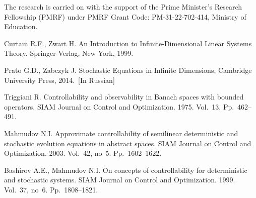 \documentclass[12pt]{llncs}
\begin{document}

%

The research is carried on with the support of the Prime Minister's Research Fellowship (PMRF) under PMRF Grant Code: PM-31-22-702-414, Ministry of Education.

\begin{thebibliography}{9} %

 Curtain R.F., Zwart H. An Introduction to Infinite-Dimensional Linear Systems Theory. Springer-Verlag, New York, 1999.

 Prato G.D., Zabczyk J. Stochastic Equations in Infinite Dimensions, Cambridge University Press, 2014.~[In Russian]

 Triggiani R. Controllability and observability in Banach spaces with bounded operators. SIAM Journal on Control and Optimization. 1975. Vol.~13. Pp.~462--491.

  Mahmudov N.I. Approximate controllability of semilinear deterministic and stochastic evolution equations in abstract spaces. SIAM Journal on Control and Optimization. 2003. Vol.~42, no~5. Pp.~1602--1622.

 Bashirov A.E., Mahmudov N.I. On concepts of controllability for deterministic and stochastic systems. SIAM Journal on Control and Optimization. 1999. Vol.~37, no~6. Pp.~1808--1821.


\end{thebibliography}

\end{document}
